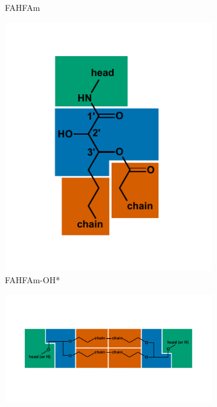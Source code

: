 {\begin{figure}[p]
\begin{subfigure}[b]{.3\linewidth}
    	\caption{FAHFAm}
        \label{fig:FAHFAm}
    \end{subfigure}
    \begin{subfigure}[b]{.3\linewidth}
        \includegraphics[width=\linewidth]{figs_ch1/FAHFAm-OH}
    	\caption{FAHFAm-OH*}
        \label{fig:FAHFAm-OH}
    \end{subfigure}
    \begin{subfigure}[b]{.6\linewidth}
        \includegraphics[width=\linewidth]{figs_ch1/GDGT}

\end{subfigure}
\end{figure}}
